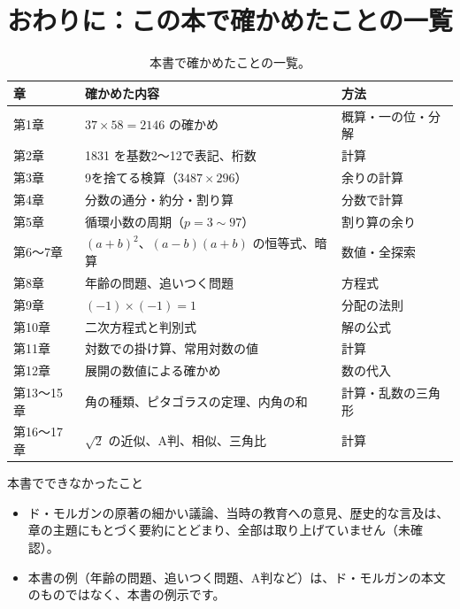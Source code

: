 \documentclass[a4paper,11pt,openany]{ltjsbook}
\begin{document}
\chapter*{おわりに：この本で確かめたことの一覧}

\begin{table}[htbp]
\centering
\small
\begin{tabular}{lll}
\toprule
章 & 確かめた内容 & 方法\\
\midrule
第1章 & $37\times58=2146$ の確かめ & 概算・一の位・分解\\
第2章 & 1831 を基数2〜12で表記、桁数 & 計算\\
第3章 & 9を捨てる検算（$3487\times296$） & 余りの計算\\
第4章 & 分数の通分・約分・割り算 & 分数で計算\\
第5章 & 循環小数の周期（$p=3\sim97$） & 割り算の余り\\
第6〜7章 & $(a+b)^2$、$(a-b)(a+b)$ の恒等式、暗算 & 数値・全探索\\
第8章 & 年齢の問題、追いつく問題 & 方程式\\
第9章 & $(-1)\times(-1)=1$ & 分配の法則\\
第10章 & 二次方程式と判別式 & 解の公式\\
第11章 & 対数での掛け算、常用対数の値 & 計算\\
第12章 & 展開の数値による確かめ & 数の代入\\
第13〜15章 & 角の種類、ピタゴラスの定理、内角の和 & 計算・乱数の三角形\\
第16〜17章 & $\sqrt2$ の近似、A判、相似、三角比 & 計算\\
\bottomrule
\end{tabular}
\caption{本書で確かめたことの一覧。}
\end{table}

\begin{notebox}{本書でできなかったこと}
\begin{itemize}[leftmargin=*]
\item ド・モルガンの原著の細かい議論、当時の教育への意見、歴史的な言及は、章の主題にもとづく要約にとどまり、全部は取り上げていません（未確認）。
\item 本書の例（年齢の問題、追いつく問題、A判など）は、ド・モルガンの本文のものではなく、本書の例示です。
\end{itemize}
\end{notebox}
\end{document}

